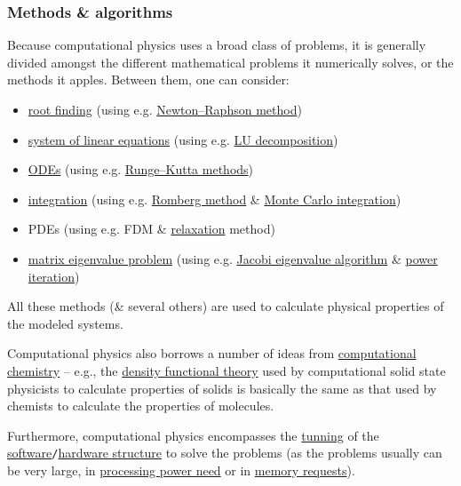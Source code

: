 \documentclass{article}
\begin{document}
\subsubsection{Methods \& algorithms}
Because computational physics uses a broad class of problems, it is generally divided amongst the different mathematical problems it numerically solves, or the methods it apples. Between them, one can consider:
\begin{itemize}
	\item \href{https://en.wikipedia.org/wiki/Root-finding_algorithm}{root finding} (using e.g. \href{https://en.wikipedia.org/wiki/Newton%27s_method}{Newton--Raphson method})
	\item \href{https://en.wikipedia.org/wiki/System_of_linear_equations}{system of linear equations} (using e.g. \href{https://en.wikipedia.org/wiki/LU_decomposition}{LU decomposition})
	\item \href{https://en.wikipedia.org/wiki/Ordinary_differential_equation}{ODEs} (using e.g. \href{https://en.wikipedia.org/wiki/Runge%E2%80%93Kutta_methods}{Runge--Kutta methods})
	\item \href{https://en.wikipedia.org/wiki/Integral}{integration} (using e.g. \href{https://en.wikipedia.org/wiki/Romberg%27s_method}{Romberg method} \& \href{https://en.wikipedia.org/wiki/Monte_Carlo_integration}{Monte Carlo integration})
	\item PDEs (using e.g. FDM \& \href{https://en.wikipedia.org/wiki/Relaxation_(iterative_method)}{relaxation} method)
	\item \href{https://en.wikipedia.org/wiki/Matrix_eigenvalue_problem}{matrix eigenvalue problem} (using e.g. \href{https://en.wikipedia.org/wiki/Jacobi_eigenvalue_algorithm}{Jacobi eigenvalue algorithm} \& \href{https://en.wikipedia.org/wiki/Power_iteration}{power iteration})
\end{itemize}
All these methods (\& several others) are used to calculate physical properties of the modeled systems.

Computational physics also borrows a number of ideas from \href{https://en.wikipedia.org/wiki/Computational_chemistry}{computational chemistry} -- e.g., the \href{https://en.wikipedia.org/wiki/Density_functional_theory}{density functional theory} used by computational solid state physicists to calculate properties of solids is basically the same as that used by chemists to calculate the properties of molecules.

Furthermore, computational physics encompasses the \href{https://en.wikipedia.org/wiki/Performance_tuning}{tunning} of the \href{https://en.wikipedia.org/wiki/Self-tuning#Examples}{software}{\tt/}\href{https://en.wikipedia.org/wiki/Category:Computer_hardware_tuning}{hardware structure} to solve the problems (as the problems usually can be very large, in \href{https://en.wikipedia.org/wiki/High_performance_computing}{processing power need} or in \href{https://en.wikipedia.org/wiki/High-throughput_computing}{memory requests}).
\end{document}
